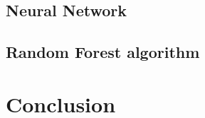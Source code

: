 \documentclass{article}
\begin{document}
\subsection{Neural Network}


\subsection{Random Forest algorithm}








\section{Conclusion}\label{section:conclusion}


\pagebreak 




\end{document}
